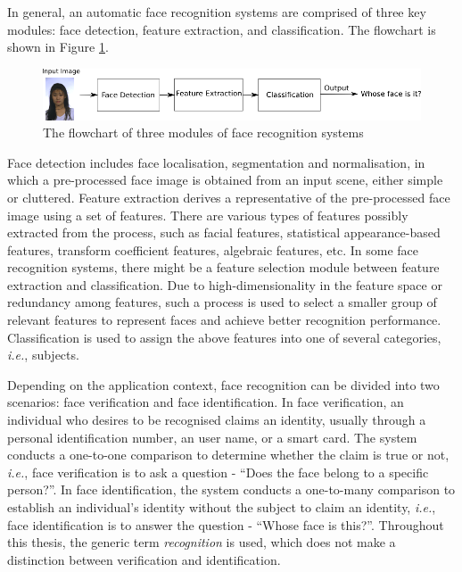In general, an automatic face recognition systems are comprised of three key modules: face detection, feature extraction, and classification. The flowchart is shown in \mbox{Figure} \ref{fig:FRSflowchart}.
\begin{figure}[ht]
 \begin{center}
  \includegraphics[width=\columnwidth]{ch1/figures/FRS_flowchart.png}
   \caption{The flowchart of three modules of face recognition systems}
    \label{fig:FRSflowchart}
 \end{center}
\end{figure} 
Face detection includes face localisation, segmentation and normalisation, in which a pre-processed face image is obtained from an input scene, either simple or cluttered. Feature extraction derives a representative of the pre-processed face image using a set of features. There are various types of features possibly extracted from the process, such as facial features, statistical appearance-based features, transform coefficient features, algebraic features, etc. In some face recognition systems, there might be a feature selection module between feature extraction and classification. Due to high-dimensionality in the feature space or redundancy among features, such a process is used to select a smaller group of relevant features to represent faces and achieve better recognition performance. Classification is used to assign the above features into one of several categories, \textit{i.e.}, subjects.

Depending on the application context, face recognition can be divided into two scenarios: face verification and face identification. In face verification, an individual who desires to be recognised claims an identity, usually through a personal identification number, an user name, or a smart card. The system conducts a one-to-one comparison to determine whether the claim is true or not, \textit{i.e.}, face verification is to ask a question - ``Does the face belong to a specific person?''. In face identification, the system conducts a one-to-many comparison to establish an individual's identity without the subject to claim an identity, \textit{i.e.}, face identification is to answer the question - ``Whose face is this?''. Throughout this thesis, the generic term \textit{recognition} is used, which does not make a distinction between verification and identification.

